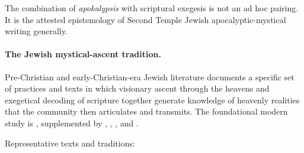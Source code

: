 \documentclass[12pt,oneside]{article}
\begin{document}
The combination of \textit{apokalypsis} with scriptural exegesis is
not an ad hoc pairing.  It is the attested epistemology of Second
Temple Jewish apocalyptic-mystical writing generally.

\paragraph{The Jewish mystical-ascent tradition.}
Pre-Christian and early-Christian-era Jewish literature documents a
specific set of practices and texts in which visionary ascent through
the heavens and exegetical decoding of scripture together generate
knowledge of heavenly realities that the community then articulates
and transmits.  The foundational modern study is \citet{Scholem1941},
supplemented by \citet{Gruenwald1980}, \citet{Rowland1982},
\citet{SchaferP2009}, and \citet{Elior2004}.

Representative texts and traditions:
\end{document}
